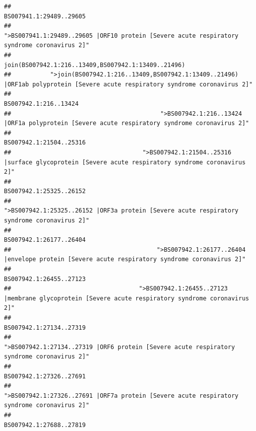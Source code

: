 \documentclass[
]{article}
\begin{document}
\begin{verbatim}
##                                                                                                                BS007941.1:29489..29605 
##                                            ">BS007941.1:29489..29605 |ORF10 protein [Severe acute respiratory syndrome coronavirus 2]" 
##                                                                                    join(BS007942.1:216..13409,BS007942.1:13409..21496) 
##           ">join(BS007942.1:216..13409,BS007942.1:13409..21496) |ORF1ab polyprotein [Severe acute respiratory syndrome coronavirus 2]" 
##                                                                                                                  BS007942.1:216..13424 
##                                          ">BS007942.1:216..13424 |ORF1a polyprotein [Severe acute respiratory syndrome coronavirus 2]" 
##                                                                                                                BS007942.1:21504..25316 
##                                     ">BS007942.1:21504..25316 |surface glycoprotein [Severe acute respiratory syndrome coronavirus 2]" 
##                                                                                                                BS007942.1:25325..26152 
##                                            ">BS007942.1:25325..26152 |ORF3a protein [Severe acute respiratory syndrome coronavirus 2]" 
##                                                                                                                BS007942.1:26177..26404 
##                                         ">BS007942.1:26177..26404 |envelope protein [Severe acute respiratory syndrome coronavirus 2]" 
##                                                                                                                BS007942.1:26455..27123 
##                                    ">BS007942.1:26455..27123 |membrane glycoprotein [Severe acute respiratory syndrome coronavirus 2]" 
##                                                                                                                BS007942.1:27134..27319 
##                                             ">BS007942.1:27134..27319 |ORF6 protein [Severe acute respiratory syndrome coronavirus 2]" 
##                                                                                                                BS007942.1:27326..27691 
##                                            ">BS007942.1:27326..27691 |ORF7a protein [Severe acute respiratory syndrome coronavirus 2]" 
##                                                                                                                BS007942.1:27688..27819 

\end{verbatim}
\end{document}
